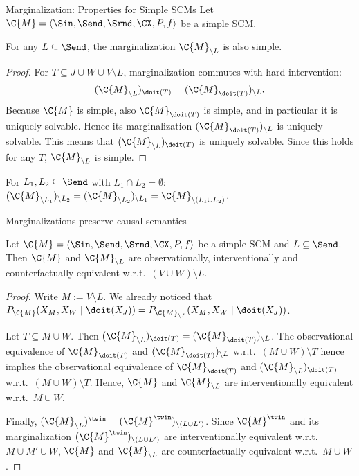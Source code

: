 \begin{frame}{Marginalization: Properties for Simple  SCMs}
Let $\C{M} = \langle \Sin, \Send, \Srnd, \CX, P, f \rangle$ be a simple SCM.
\begin{Prp}
  For any $L \subseteq \Send$, the marginalization $\C{M}_{\setminus L}$ is also simple.
\end{Prp}
\begin{proof}
  For $T \subseteq J \cup W \cup V \setminus L$, marginalization commutes with hard intervention:
  $$(\C{M}_{\setminus L})_{\doit(T)} = (\C{M}_{\doit(T)})_{\setminus L}.$$
  Because $\C{M}$ is simple, also $\C{M}_{\doit(T)}$ is simple, and in particular it is
  uniquely solvable. 
  Hence its marginalization $(\C{M}_{\doit(T)})_{\setminus L}$ is uniquely solvable.
  This means that $(\C{M}_{\setminus L})_{\doit(T)}$ is uniquely solvable. Since this
  holds for any $T$, $\C{M}_{\setminus L}$ is simple.
\end{proof}
\begin{Cor}
  For $L_1, L_2 \subseteq \Send$ with $L_1 \cap L_2 = \emptyset$:
    $(\C{M}_{\setminus L_1})_{\setminus L_2} = (\C{M}_{\setminus L_2})_{\setminus L_1} = \C{M}_{\setminus (L_1 \cup L_2)}$.
\end{Cor}
\end{frame}

\begin{frame}{Marginalizations preserve causal semantics}
\begin{Thm}
  Let $\C{M} = \langle \Sin, \Send, \Srnd, \CX, P, f \rangle$ be a simple SCM and $L \subseteq \Send$.
  Then $\C{M}$ and $\C{M}_{\setminus L}$ are observationally,
  interventionally and counterfactually equivalent w.r.t.\ $(V \cup W) \setminus L$.
\end{Thm}
\begin{proof}
  Write $M := V \setminus L$. We already noticed that
  $P_{\C{M}}(X_M,X_W \mid \doit(X_J)) = P_{\C{M}_{\setminus L}}(X_M,X_W \mid \doit(X_J))$.

  Let $T \subseteq M \cup W$. Then $(\C{M}_{\setminus L})_{\doit(T)} = (\C{M}_{\doit(T)})_{\setminus L}$.
  The observational equivalence of $\C{M}_{\doit(T)}$ and $(\C{M}_{\doit(T)})_{\setminus L}$ w.r.t.\ $(M \cup W) \setminus T$ hence implies the observational equivalence of $\C{M}_{\doit(T)}$ and $(\C{M}_{\setminus L})_{\doit(T)}$ w.r.t.\ $(M \cup W) \setminus T$.
  Hence, $\C{M}$ and $\C{M}_{\setminus L}$ are interventionally equivalent w.r.t.\ $M \cup W$.

  Finally, $(\C{M}_{\setminus L})^\twin = (\C{M}^\twin)_{\setminus (L \cup L')}$. Since $\C{M}^\twin$ and its marginalization
  $(\C{M}^\twin)_{\setminus (L \cup L')}$ are interventionally equivalent w.r.t.\ $M \cup M' \cup W$,
  $\C{M}$ and $\C{M}_{\setminus L}$ are counterfactually equivalent w.r.t.\ $M \cup W$.
\end{proof}
\end{frame}

